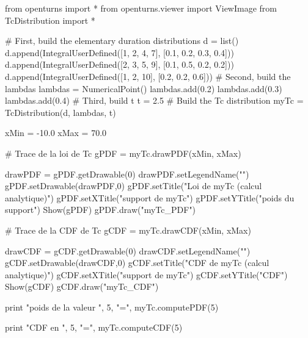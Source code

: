 from openturns import *
from openturns.viewer import ViewImage
from TcDistribution import *

# First, build the elementary duration distributions
d = list()
d.append(IntegralUserDefined([1, 2, 4, 7], [0.1, 0.2, 0.3, 0.4]))
d.append(IntegralUserDefined([2, 3, 5, 9], [0.1, 0.5, 0.2, 0.2]))
d.append(IntegralUserDefined([1, 2, 10], [0.2, 0.2, 0.6]))
# Second, build the lambdas
lambdas = NumericalPoint()
lambdas.add(0.2)
lambdas.add(0.3)
lambdas.add(0.4)
# Third, build t
t = 2.5
# Build the Tc distribution
myTc = TcDistribution(d, lambdas, t)


xMin = -10.0
xMax = 70.0

# Trace de la loi de Tc
gPDF = myTc.drawPDF(xMin, xMax)

drawPDF = gPDF.getDrawable(0)
drawPDF.setLegendName("")
gPDF.setDrawable(drawPDF,0)
gPDF.setTitle("Loi de myTc (calcul analytique)")
gPDF.setXTitle("support de myTc")
gPDF.setYTitle("poids du support")
Show(gPDF)
gPDF.draw("myTc_PDF")

# Trace de la CDF de Tc
gCDF = myTc.drawCDF(xMin, xMax)

drawCDF = gCDF.getDrawable(0)
drawCDF.setLegendName("")
gCDF.setDrawable(drawCDF,0)
gCDF.setTitle("CDF de myTc (calcul analytique)")
gCDF.setXTitle("support de myTc")
gCDF.setYTitle("CDF")
Show(gCDF)
gCDF.draw("myTc_CDF")

print "poids de la valeur ", 5, "=", myTc.computePDF(5)

print "CDF en ", 5, "=", myTc.computeCDF(5)

